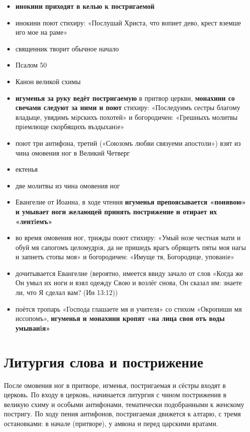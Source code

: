 \begin{itemize}
\tightlist
\item
  \textbf{инокини приходят в келью к постригаемой}
\item
  инокини поют стихиру: «Послушай Христа, что вопиет дево, крест вземше иго мое на раме»
\item
  священник творит обычное начало
\item
  Псалом 50
\item
  Канон великой схимы
\item
  \textbf{игуменья за руку ведёт постригаемую} в притвор церкви, \textbf{монахини со свечами следуют за ними и поют} стихиру: «Последуимъ сестры благому владыце, увядимъ мiрскихъ похотей» и богородичен: «Грешныхъ молитвы прiемлюще скорбящихъ въздыханiе»
\item
  поют три антифона, третий («Союзомъ любви связуеми апостоли») взят из чина омовения ног в Великий Четверг
\item
  ектенья
\item
  две молитвы из чина омовения ног
\item
  Евангелие от Иоанна, в ходе чтения \textbf{игуменья препоясывается «понявою» и умывает ноги желающей принять пострижение и отирает их «лентiемъ»}
\item
  во время омовения ног, трижды поют стихиру: «Умый нозе честная мати и обуй мя сапогомъ целомудрiя, да не пришедъ врагъ обрящетъ пяты моя нагы и запнетъ стопы моя» и богородичен: «Имуще тя, Богородице, упованiе»
\item
  дочитывается Евангелие (вероятно, имеется ввиду зачало от слов «Когда же Он умыл их ноги и взял одежду Свою и возлёг снова, Он сказал им: знаете ли, что Я сделал вам? (Ин 13:12))
\item
  поётся тропарь «Господа глашаете мя и учителя» со стихом «Окропиши мя иссопомъ», \textbf{игуменья и монахини кропят «на лица своя отъ воды умыванiя»}
\end{itemize}

\section*{Литургия слова и пострижение}\label{ux43bux438ux442ux443ux440ux433ux438ux44f-ux441ux43bux43eux432ux430-ux438-ux43fux43eux441ux442ux440ux438ux436ux435ux43dux438ux435}

После омовения ног в притворе, игменья, постригаемая и сёстры входят в церковь.
По входу в церковь, начинается литургия с чином пострижения в великую схиму и особыми антифонами, тематически подобранными к женскому постригу.
По ходу пения антифонов, постригаемая движется к алтарю, с тремя остановками: в начале (притворе), у амвона и перед царскими вратами.

